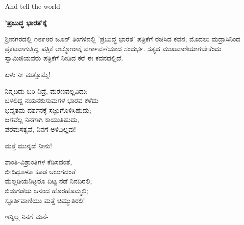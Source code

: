And tell the world

\begin{myquote}
\end{myquote}

\selectkan

\begin{center}
\textbf{'ಪ್ರಬುದ್ಧ ಭಾರತ'ಕ್ಕೆ}
\end{center}

ಶ‍್ರೀನಗರದಲ್ಲಿ ೧೮೯೮ರ ಜೂನ್ ತಿಂಗಳಿನಲ್ಲಿ 'ಪ್ರಬುದ್ಧ ಭಾರತ' ಪತ್ರಿಕೆಗೆ ರಚಿಸಿದ ಕವನ; ಮೊದಲು ಮದ್ರಾಸಿನಿಂದ ಪ್ರಕಟವಾಗುತ್ತಿದ್ದ ಪತ್ರಿಕೆ ಆಲ್ಮೋರಾಕ್ಕೆ ವರ್ಗಾವಣೆಯಾದ ಸಂದರ್ಭ. ಸತ್ಯದ ಮುಖವಾಣಿಯಾಗಬೇಕೆಂದು ಸ್ವಾಮಿಜಿಯವರು ಪತ್ರಿಕೆಗೆ ನೀಡಿದ ಕರೆ ಈ ಕವನದಲ್ಲಿದೆ.

ಏಳು ನೀ ಮತ್ತೊಮ್ಮೆ!

\begin{myquote}
ನಿನ್ನದಿದು ಬರಿ ನಿದ್ರೆ, ಮರಣವಲ್ಲವಿದು;\\ಬಳಲಿದ್ದ ನಯನಕುಸುಮಗಳ ಭಾರವ ಕಳೆದು\\ಭವ್ಯತಮ ದರ್ಶನಕ್ಕೆ ಸಜ್ಜುಗೊಳಿಸಿಹುದು;\\ಜಗವೆಲ್ಲ ನಿನಗಾಗಿ ಕಾಯುತಿಹುದು,\\ಪರಮಸತ್ಯವೆ, ನಿನಗೆ ಅಳಿವಿಲ್ಲವು!
\end{myquote}

ಮತ್ತೆ ಮುನ್ನಡೆ ನೀನು!

\begin{myquote}
ಶಾಂತಿ-ವಿಶ್ರಾಂತಿಗಳ ಕೆಡಿಸದಂತೆ,\\ಬೀದಿಧೂಳೂ ಕೂಡ ಅಲುಗದಂತೆ\\ಮೆಲ್ಲಡಿಯನಿಟ್ಟರೂ ದಿಟ್ಟ ನಡೆ ನಿನದಿರಲಿ;\\ಬಿಡುಗಡೆಯ ಆನಂದ ಹೊರಹೊಮ್ಮಲಿ;\\ಸ್ಫೂರ್ತಿವಾಣಿಯು ಮತ್ತೆ ಚಿಮ್ಮುತಿರಲಿ!
\end{myquote}

ಇನ್ನಿಲ್ಲ ನಿನಗೆ ಮನೆ-

